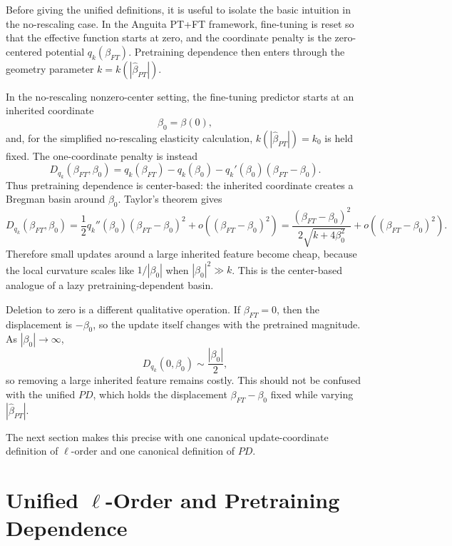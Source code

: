 \documentclass[11pt]{article}
\begin{document}
Before giving the unified definitions, it is useful to isolate the basic intuition in the no-rescaling case. In the Anguita PT+FT framework, fine-tuning is reset so that the effective function starts at zero, and the coordinate penalty is the zero-centered potential \(q_k(\beta_{FT})\). Pretraining dependence then enters through the geometry parameter \(k=k(|\widehat\beta_{PT}|)\).

In the no-rescaling nonzero-center setting, the fine-tuning predictor starts at an inherited coordinate
\begin{equation}
    \beta_0=\beta(0),
\end{equation}
and, for the simplified no-rescaling elasticity calculation, \(k(|\widehat\beta_{PT}|)=k_0\) is held fixed. The one-coordinate penalty is instead
\begin{equation}
    D_{q_k}(\beta_{FT},\beta_0)
    =
    q_k(\beta_{FT})-q_k(\beta_0)-q_k'(\beta_0)(\beta_{FT}-\beta_0).
\end{equation}
Thus pretraining dependence is center-based: the inherited coordinate creates a Bregman basin around \(\beta_0\). Taylor's theorem gives
\begin{equation}
    D_{q_k}(\beta_{FT},\beta_0)
    =
    \frac12q_k''(\beta_0)(\beta_{FT}-\beta_0)^2
    +
    o((\beta_{FT}-\beta_0)^2)
    =
    \frac{(\beta_{FT}-\beta_0)^2}{2\sqrt{k+4\beta_0^2}}
    +
    o((\beta_{FT}-\beta_0)^2).
\end{equation}
Therefore small updates around a large inherited feature become cheap, because the local curvature scales like \(1/|\beta_0|\) when \(|\beta_0|^2\gg k\). This is the center-based analogue of a lazy pretraining-dependent basin.

Deletion to zero is a different qualitative operation. If \(\beta_{FT}=0\), then the displacement is \(-\beta_0\), so the update itself changes with the pretrained magnitude. As \(|\beta_0|\to\infty\),
\begin{equation}
    D_{q_k}(0,\beta_0)\sim\frac{|\beta_0|}{2},
\end{equation}
so removing a large inherited feature remains costly. This should not be confused with the unified \(PD\), which holds the displacement \(\beta_{FT}-\beta_0\) fixed while varying \(|\widehat\beta_{PT}|\).

The next section makes this precise with one canonical update-coordinate definition of \(\ell\)-order and one canonical definition of \(PD\).


\section{Unified \texorpdfstring{\(\ell\)-Order and Pretraining Dependence}{l-Order and Pretraining Dependence}}
\end{document}
